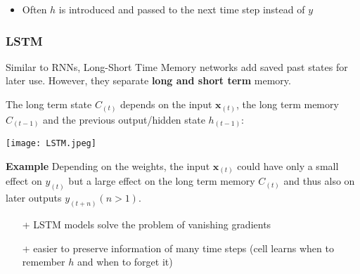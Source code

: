 \newpar{}
\begin{itemize}
    \item Often $h$ is introduced and passed to the next time step instead of $y$
\end{itemize}


\subsubsection{LSTM}
Similar to RNNs, Long-Short Time Memory networks add saved past states for later use. However, they separate \textbf{long and short term} memory.

The long term state $C_{(t)}$ depends on the input $\mathbf{x}_{(t)}$, the long term memory $C_{(t-1)}$ and the previous output/hidden state $h_{(t-1)}$:
\begin{center}
    \texttt{[image: LSTM.jpeg]}
\end{center}

\textbf{Example}
Depending on the weights, the input $\mathbf{x}_{(t)}$ could have only a small effect on $y_{(t)}$ but a large effect on the long term memory $C_{(t)}$ and thus also on later outputs $y_{(t+n)} (n>1)$.

\newpar{}
\begin{itemize}
    \item [+] LSTM models solve the problem of vanishing gradients
    \item [+] easier to preserve information of many time steps (cell learns when to remember $h$ and when to forget it)
\end{itemize}
